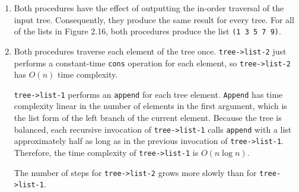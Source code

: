 \documentclass{article}
\begin{document}
\begin{enumerate}
    \item Both procedures have the effect of outputting the in-order traversal
        of the input tree. Consequently, they produce the same result for every
        tree. For all of the lists in Figure 2.16, both procedures
        produce the list \texttt{(1 3 5 7 9)}.
    \item Both procedures traverse each element of the tree once.
        \texttt{tree->list-2} just performs a constant-time \texttt{cons}
        operation for each element, so \texttt{tree->list-2} has $O(n)$ time
        complexity.

        \texttt{tree->list-1} performs an \texttt{append} for each
        tree element. \texttt{Append} has time complexity linear in the number
        of elements in the first argument, which is the list form of the left
        branch of the current element. Because the tree is balanced, each
        recursive invocation of \texttt{tree->list-1} calls \texttt{append} with
        a list approximately half as long as in the previous invocation of
        \texttt{tree->list-1}. Therefore, the time complexity of
        \texttt{tree->list-1} is $O(n\log n)$.

        The number of steps for \texttt{tree->list-2} grows more slowly than for
        \texttt{tree->list-1}.
\end{enumerate}
\end{document}
